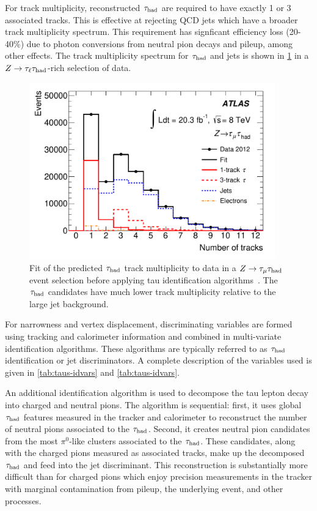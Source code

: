For track multiplicity, reconstructed $\tau_\text{had}$ are required to have exactly 1 or 3 associated tracks. This is effective at rejecting QCD jets which have a broader track multiplicity spectrum. This requirement has signficant efficiency loss (20-40\%) due to photon conversions from neutral pion decays and pileup, among other effects. The track multiplicity spectrum for $\tau_\text{had}$ and jets is shown in \cref{fig:taus-trackmultiplicity} in a $Z\rightarrow\tau_\ell\tau_\text{had}$-rich selection of data.

\begin{figure}[tp]
  \centering
  \includegraphics[width=0.95\textwidth]{figures/PERF-2013-06/fig_10a}
  \caption{Fit of the predicted $\tau_\text{had}$ track multiplicity to data in a $Z\rightarrow\tau_\mu \tau_\text{had}$ event selection before applying tau identification algorithms~\cite{PERF-2013-06}. The $\tau_\text{had}$ candidates have much lower track multiplicity relative to the large jet background.}
  \label{fig:taus-trackmultiplicity}
\end{figure}

For narrowness and vertex displacement, discriminating variables are formed using tracking and calorimeter information and combined in multi-variate identification algorithms. These algorithms are typically referred to as $\tau_\text{had}$ identification or jet discriminators. A complete description of the variables used is given in \cref{tab:taus-idvars} and \cref{tab:taus-idvars}.

An additional identification algorithm is used to decompose the tau lepton decay into charged and neutral pions. The algorithm is sequential: first, it uses global $\tau_\text{had}$ features measured in the tracker and calorimeter to reconstruct the number of neutral pions associated to the $\tau_\text{had}$. Second, it creates neutral pion candidates from the most $\pi^0$-like clusters associated to the $\tau_\text{had}$. These candidates, along with the charged pions measured as associated tracks, make up the decomposed $\tau_\text{had}$ and feed into the jet discriminant. This reconstruction is substantially more difficult than for charged pions which enjoy precision measurements in the tracker with marginal contamination from pileup, the underlying event, and other processes.

